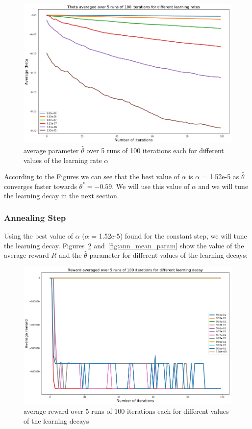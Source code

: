 \documentclass[11pt]{article}
\numberwithin{figure}{section} %
\begin{document}
\begin{figure}[H]
		\centering
		\includegraphics[width=0.9\linewidth]{images/avg_theta_consistent}
		\caption{average parameter $\widehat{\theta}$ over 5 runs of 100 iterations each for different values of the learning rate $\alpha$}
		\label{fig:cst_mean_param}
\end{figure}

According to the Figures we can see that the best value of $\alpha$ is $\alpha$ = 1.52e-5 as $\widehat{\theta}$ converges faster towards $\theta^* = -0.59$. We will use this value of $\alpha$ and we will tune the learning decay in the next section.

\subsubsection{Annealing Step}
Using the best value of $\alpha$ ($\alpha$ = 1.52e-5) found for the constant step, we will tune the learning decay. Figures~\ref{fig:ann_avg_reward} and~\ref{fig:ann_mean_param} show the value of the average reward $R$ and the $\widehat{\theta}$ parameter for different values of the learning decays:

\begin{figure}[H]
		\centering
		\includegraphics[width=0.9\linewidth]{images/ld_avg_reward}
		\caption{average reward over 5 runs of 100 iterations each for different values of the learning decays}
		\label{fig:ann_avg_reward}
\end{figure}
\end{document}
